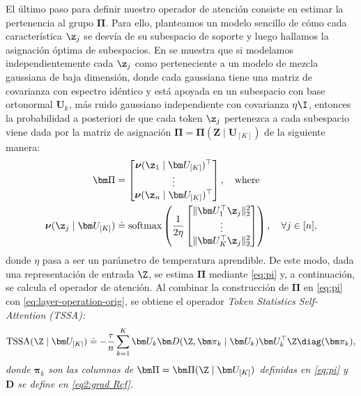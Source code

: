 \documentclass[../../book-main.tex]{subfiles}
\begin{document}
El último paso para definir nuestro operador de atención consiste en estimar la
pertenencia al grupo $\bm\Pi$. Para ello, planteamos un modelo sencillo de cómo
cada característica \(\z_{j}\) se desvía de su subespacio de soporte y
luego hallamos la asignación óptima de subespacios. En \cite{yu2023white} se muestra
que si modelamos independientemente cada \(\z_{j}\) como perteneciente a un
modelo de mezcla gaussiana de baja dimensión, donde cada gaussiana tiene una
matriz de covarianza con espectro idéntico y está apoyada en un
subespacio con base ortonormal \(\bm U_{k}\), más
ruido gaussiano independiente con covarianza \(\eta \I\), entonces la probabilidad a posteriori
de que cada token \(\z_{j}\) pertenezca a cada subespacio viene
dada por la matriz de asignación \(\bm \Pi = \bm \Pi(\bm Z \mid \bm
U_{[K]})\) de la siguiente manera:
\begin{align}\label{eq:pi}
    \bm \Pi & =
    \begin{bmatrix} \boldsymbol{\nu}(\z_1 \mid \bm U_{[K]})^\top
        \\ \vdots \\ \boldsymbol{\nu}(\z_n \mid \bm U_{[K]})^\top
    \end{bmatrix}, \quad
    \text{where} \\
    \boldsymbol{\nu}(\z_j \mid \bm U_{[K]}) &\doteq
    \operatorname{softmax}\left( \frac{1}{2\eta}
        \begin{bmatrix} \|  \bm U_{1}^{\top} \z_j \|_2^2 \\ \vdots
            \\ \| \bm U_{K}^{\top} \z_j \|_2^2
    \end{bmatrix} \right), \quad \forall j \in [n],
\end{align}
donde $\eta$ pasa a ser un parámetro de temperatura aprendible. De este modo, dada una 
representación de entrada $\Z$, se estima $\bm\Pi$ mediante \eqref{eq:pi} y, a continuación, 
se calcula el operador de atención. Al combinar la construcción de $\bm\Pi$ en \eqref{eq:pi} 
con \eqref{eq:layer-operation-orig}, se obtiene el 
operador \em{Token Statistics Self-Attention} (TSSA):
\begin{equation}
    \label{eq:tssa}
    \operatorname{TSSA}(\Z \mid \bm U_{[K]}) \doteq -\frac{\tau}{n}\sum_{k
    = 1}^{K}\bm U_{k}\bm D(\Z, \bm\pi_{k} \mid \bm U_{k})\bm
    U_{k}^{\top}\Z\diag(\bm \pi_{k}),
\end{equation}
donde \(\bm\pi_{k}\) son las columnas de \(\bm\Pi = \bm\Pi(\Z \mid \bm
U_{[K]})\) definidas en \eqref{eq:pi} y \(\bm D\) se define en
\eqref{eq2:grad Rcf}.
\end{document}
